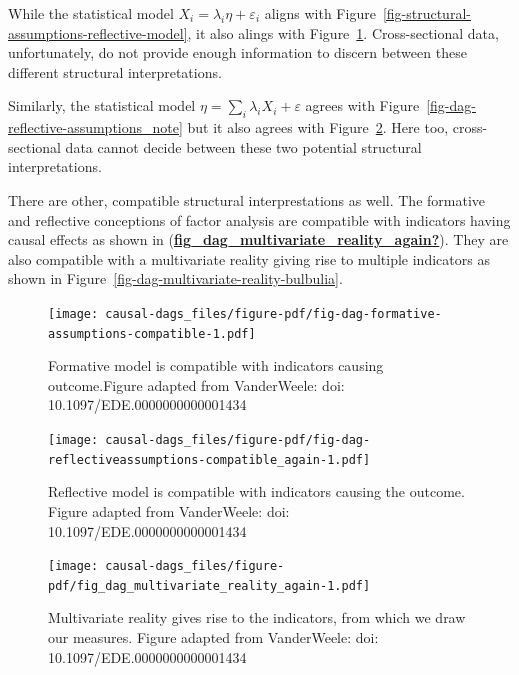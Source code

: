 \documentclass[
  singlecolumn]{report}
\begin{document}
While the statistical model \(X_i = \lambda_i \eta + \varepsilon_i\)
aligns with Figure~\ref{fig-structural-assumptions-reflective-model}, it
also alings with Figure~\ref{fig-dag-formative-assumptions-compatible}.
Cross-sectional data, unfortunately, do not provide enough information
to discern between these different structural interpretations.

Similarly, the statistical model
\(\eta = \sum_i\lambda_i X_i + \varepsilon\) agrees with
Figure~\ref{fig-dag-reflective-assumptions_note} but it also agrees with
Figure~\ref{fig-dag-reflectiveassumptions-compatible_again}. Here too,
cross-sectional data cannot decide between these two potential
structural interpretations.

There are other, compatible structural interprestations as well. The
formative and reflective conceptions of factor analysis are compatible
with indicators having causal effects as shown in
(\protect\hyperlink{ref-fig_dag_multivariate_reality_again}{\textbf{fig\_dag\_multivariate\_reality\_again?}}).
They are also compatible with a multivariate reality giving rise to
multiple indicators as shown in
Figure~\ref{fig-dag-multivariate-reality-bulbulia}.

\begin{figure}

{\centering \texttt{[image: causal-dags\_files/figure-pdf/fig-dag-formative-assumptions-compatible-1.pdf]}

}

\caption{\label{fig-dag-formative-assumptions-compatible}Formative model
is compatible with indicators causing outcome.Figure adapted from
VanderWeele: doi: 10.1097/EDE.0000000000001434}

\end{figure}

\begin{figure}

{\centering \texttt{[image: causal-dags\_files/figure-pdf/fig-dag-reflectiveassumptions-compatible\_again-1.pdf]}

}

\caption{\label{fig-dag-reflectiveassumptions-compatible_again}Reflective
model is compatible with indicators causing the outcome. Figure adapted
from VanderWeele: doi: 10.1097/EDE.0000000000001434}

\end{figure}

\begin{figure}

{\centering \texttt{[image: causal-dags\_files/figure-pdf/fig\_dag\_multivariate\_reality\_again-1.pdf]}

}

\caption{Multivariate reality gives rise to the indicators, from which
we draw our measures. Figure adapted from VanderWeele: doi:
10.1097/EDE.0000000000001434}

\end{figure}
\end{document}
